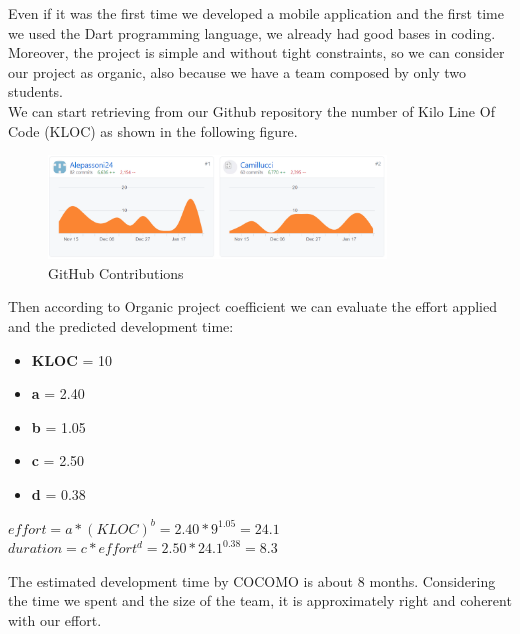Even if it was the first time we developed a mobile application and the first time we used the Dart programming language, we already had good bases in coding.
Moreover, the project is simple and without tight constraints, so we can consider our project as organic, also because we have a team composed by only two students.\\
We can start retrieving from our Github repository the number of Kilo Line Of Code (KLOC) as shown in the following figure.\\
\begin{figure}[H]
		\begin{center}
			\centering
			\includegraphics[width=0.8\textwidth]{img/RepoInsights.png}
			\caption{GitHub Contributions}
		\end{center}
	\end{figure}
Then according to Organic project coefficient we can evaluate the effort applied and the predicted development time:

\begin{itemize}
	\item \textbf{KLOC} = 10
	\item \textbf{a} = 2.40
	\item \textbf{b} = 1.05
	\item \textbf{c} = 2.50
	\item \textbf{d} = 0.38
\end{itemize}

\begin{center}
$ effort = a * (KLOC)^{b} = 2.40 * 9^{1.05} = 24.1 $\\
$ duration = c * effort^{d} = 2.50 * 24.1 ^{0.38} = 8.3 $\\
\end{center}

The estimated development time by COCOMO is about 8 months.
Considering the time we spent and the size of the team, it is approximately right and coherent with our effort.
